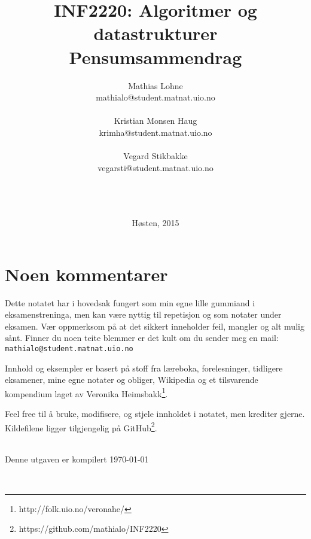 \documentclass[10pt,norsk,a4paper,hidelinks]{article}
\title{\sffamily \Huge INF2220: Algoritmer og datastrukturer\\ Pensumsammendrag}
\author{\sffamily Mathias Lohne\\ \footnotesize\sffamily mathialo@student.matnat.uio.no\\~\\\sffamily Kristian Monsen Haug\\ \footnotesize\sffamily krimha@student.matnat.uio.no \\~\\ \sffamily Vegard Stikbakke \\ \footnotesize \footnotesize\sffamily vegarsti@student.matnat.uio.no}
\date{~\\~\\~\\\sffamily Høsten, 2015}
\theoremstyle{indented}
\begin{document}
\maketitle
\thispagestyle{empty}
\vfill
\newpage
{}
\thispagestyle{plain}

\section*{Noen kommentarer}
Dette notatet har i hovedsak fungert som min egne lille gummiand i eksamenstreninga, men kan være nyttig til repetisjon og som notater under eksamen. Vær oppmerksom på at det sikkert inneholder feil, mangler og alt mulig sånt. Finner du noen teite blemmer er det kult om du sender meg en mail: \verb|mathialo@student.matnat.uio.no|

Innhold og eksempler er basert på stoff fra læreboka, forelesninger, tidligere eksamener, mine egne notater og obliger, Wikipedia og et tilsvarende kompendium laget av Veronika Heimsbakk\footnote{http://folk.uio.no/veronahe/}.

Feel free til å bruke, modifisere, og stjele innholdet i notatet, men krediter gjerne. Kildefilene ligger tilgjengelig på GitHub\footnote{https://github.com/mathialo/INF2220}.

~\\Denne utgaven er kompilert \today

~\\

\tableofcontents
\thispagestyle{plain}
\newpage
{}

\newpage
\newpage
\newpage
\newpage

\newpage

\newpage
\newpage



\newpage
\appendix



\end{document}
